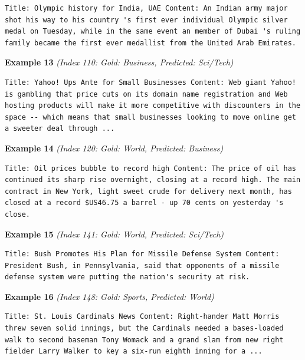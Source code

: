 \begin{Verbatim}[breaklines=true,breakanywhere=true,fontsize=\small]
Title: Olympic history for India, UAE Content: An Indian army major shot his way to his country 's first ever individual Olympic silver medal on Tuesday, while in the same event an member of Dubai 's ruling family became the first ever medallist from the United Arab Emirates.
\end{Verbatim}

\noindent
\textbf{Example 13} \quad \textit{(Index 110: Gold: Business, Predicted: Sci/Tech)}

\begin{Verbatim}[breaklines=true,breakanywhere=true,fontsize=\small]
Title: Yahoo! Ups Ante for Small Businesses Content: Web giant Yahoo! is gambling that price cuts on its domain name registration and Web hosting products will make it more competitive with discounters in the space -- which means that small businesses looking to move online get a sweeter deal through ...
\end{Verbatim}

\noindent
\textbf{Example 14} \quad \textit{(Index 120: Gold: World, Predicted: Business)}

\begin{Verbatim}[breaklines=true,breakanywhere=true,fontsize=\small]
Title: Oil prices bubble to record high Content: The price of oil has continued its sharp rise overnight, closing at a record high. The main contract in New York, light sweet crude for delivery next month, has closed at a record $US46.75 a barrel - up 70 cents on yesterday 's close.
\end{Verbatim}

\noindent
\textbf{Example 15} \quad \textit{(Index 141: Gold: World, Predicted: Sci/Tech)}

\begin{Verbatim}[breaklines=true,breakanywhere=true,fontsize=\small]
Title: Bush Promotes His Plan for Missile Defense System Content: President Bush, in Pennsylvania, said that opponents of a missile defense system were putting the nation's security at risk.
\end{Verbatim}

\noindent
\textbf{Example 16} \quad \textit{(Index 148: Gold: Sports, Predicted: World)}

\begin{Verbatim}[breaklines=true,breakanywhere=true,fontsize=\small]
Title: St. Louis Cardinals News Content: Right-hander Matt Morris threw seven solid innings, but the Cardinals needed a bases-loaded walk to second baseman Tony Womack and a grand slam from new right fielder Larry Walker to key a six-run eighth inning for a ...
\end{Verbatim}


